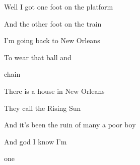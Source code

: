 \begin{song}
\bigskip

Well I got one foot  on the platform  \par
And the other foot on the train  \par
I’m going back to New Orleans  \par
To wear that ball and \par
{}chain    \par
{}    \par

\bigskip

There is a house in New Orleans  \par
They call the Rising Sun  \par
And it’s been the ruin of many a poor boy \par
And god I know I’m \par
{}one    \par
{}    \par
{} \par
{}    \par
{}    \par
{} \par

\end{song}

